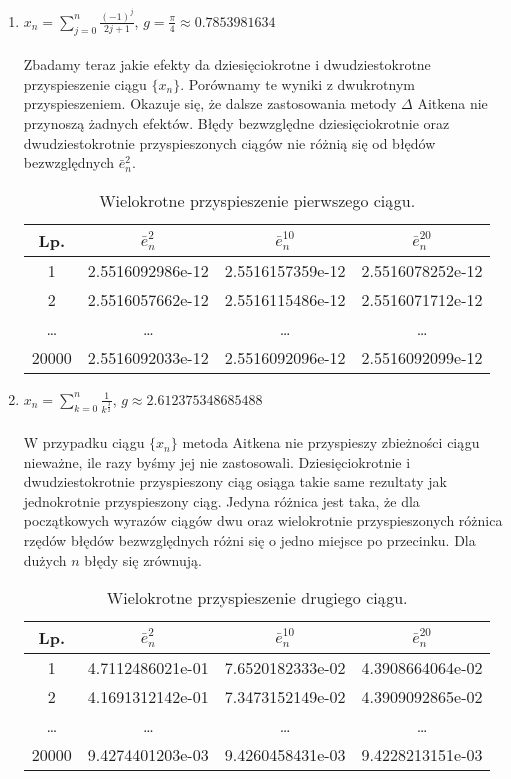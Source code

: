 \documentclass{article}
\begin{document}
\begin{enumerate}

\item $x_n = \sum\limits_{j=0}^n \frac{(-1)^j}{2j + 1}$, $g = \frac{\pi}{4} \approx 0.7853981634$ \\ \\
Zbadamy teraz jakie efekty da dziesięciokrotne i dwudziestokrotne przyspieszenie ciągu $\{x_n\}$. Porównamy te wyniki z dwukrotnym przyspieszeniem. Okazuje się, że dalsze zastosowania metody $\Delta$ Aitkena nie przynoszą żadnych efektów. Błędy bezwzględne dziesięciokrotnie oraz dwudziestokrotnie przyspieszonych ciągów nie różnią się od błędów bezwzględnych $\bar{e}_n^2$.
\begin{table}[h]
\centering
\begin{tabular}[c]{|c|c|c|c|}
\hline
\textbf{Lp.} & $\bar{e}_n^2$ & $\bar{e}_n^{10}$ & $\bar{e}_n^{20}$ \\
\hline
1 & 
2.5516092986e-12 &
2.5516157359e-12 &
2.5516078252e-12 \\
\hline
2 &
2.5516057662e-12 &
2.5516115486e-12 &
2.5516071712e-12 \\
\hline
\dots & \ldots & \ldots & \ldots \\
\hline
20000 &
2.5516092033e-12 &
2.5516092096e-12 &
2.5516092099e-12 \\
\hline
\end{tabular}
\caption{Wielokrotne przyspieszenie pierwszego ciągu.}
\end{table}

\item $x_n = \sum\limits_{k=0}^n \frac{1}{k^\frac{3}{2}}$, $g \approx 2.612375348685488$ \\ \\
W przypadku ciągu $\{x_n\}$ metoda Aitkena nie przyspieszy zbieżności ciągu nieważne, ile razy byśmy jej nie zastosowali. Dziesięciokrotnie i dwudziestokrotnie przyspieszony ciąg osiąga takie same rezultaty jak jednokrotnie przyspieszony ciąg. Jedyna różnica jest taka, że dla początkowych wyrazów ciągów dwu oraz wielokrotnie przyspieszonych różnica rzędów błędów bezwzględnych różni się o jedno miejsce po przecinku. Dla dużych $n$ błędy się zrównują.
\begin{table}[h]
\centering
\begin{tabular}[c]{|c|c|c|c|}
\hline
\textbf{Lp.} & $\bar{e}_n^{2}$ & $\bar{e}_n^{10}$ & $\bar{e}_n^{20}$\\
\hline
1 & 
4.7112486021e-01 &
7.6520182333e-02 &
4.3908664064e-02 \\
\hline
2 &
4.1691312142e-01 &
7.3473152149e-02 &
4.3909092865e-02 \\
\hline
\dots & \ldots & \ldots & \ldots \\
\hline
20000 &
9.4274401203e-03 &
9.4260458431e-03 &
9.4228213151e-03 \\
\hline
\end{tabular}
\caption{Wielokrotne przyspieszenie drugiego ciągu.}
\end{table}


\end{enumerate}
\end{document}

